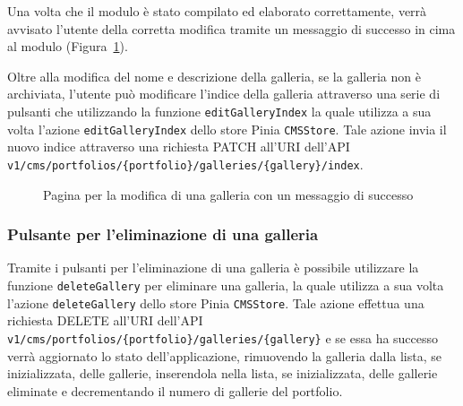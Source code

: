 Una volta che il modulo \`e stato compilato ed elaborato correttamente, verr\`a avvisato l'utente della corretta modifica tramite un messaggio di successo in cima al modulo  (Figura~\ref{fig:cms-g-update-success}).

Oltre alla modifica del nome e descrizione della galleria, se la galleria non \`e archiviata, l'utente pu\`o modificare l'indice della galleria attraverso una serie di pulsanti che utilizzando la funzione \verb|editGalleryIndex| la quale utilizza a sua volta l'azione \verb|editGalleryIndex| dello store Pinia \verb|CMSStore|.  Tale azione invia il nuovo indice attraverso una richiesta PATCH all'URI dell'API \verb|v1/cms/portfolios/{portfolio}/galleries/{gallery}/index|.

\begin{figure}[htbp]
	\centering
	\fboxsep=0.5pt
	\fboxrule=0.5pt
	\caption{Pagina per la modifica di una galleria con un messaggio di successo}
	\label{fig:cms-g-update-success}
\end{figure}

\subsubsection{Pulsante per l'eliminazione di una galleria}
Tramite i pulsanti per l'eliminazione di una galleria \`e possibile utilizzare la funzione \verb|deleteGallery| per eliminare una galleria, la quale utilizza a sua volta l'azione \verb|deleteGallery| dello store Pinia \verb|CMSStore|. Tale azione effettua una richiesta DELETE all'URI dell'API \verb|v1/cms/portfolios/{portfolio}/galleries/{gallery}| e se essa ha successo verr\`a aggiornato lo stato dell'applicazione, rimuovendo la galleria dalla lista, se inizializzata, delle gallerie, inserendola nella lista, se inizializzata, delle gallerie eliminate e decrementando il numero di gallerie del portfolio. 


